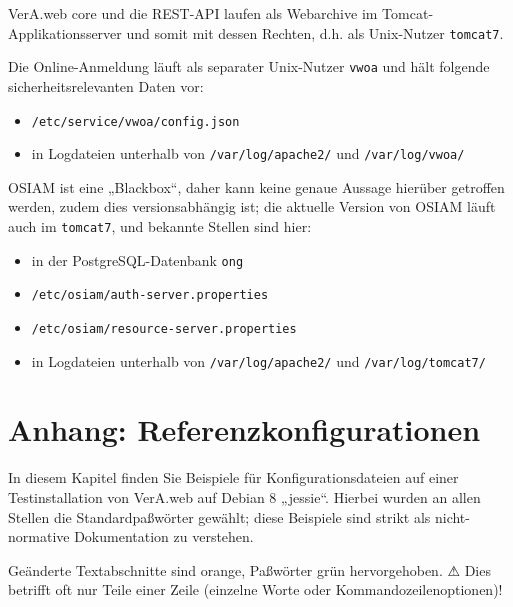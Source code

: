VerA.web core und die REST-API laufen als Webarchive im
Tomcat-Applikationsserver und somit mit dessen Rechten,
d.h. als Unix-Nutzer \texttt{tomcat7}.

\ifoa

Die Online-Anmeldung läuft als separater Unix-Nutzer \texttt{vwoa}
und hält folgende sicherheitsrelevanten Daten vor:\keinumbruch

\begin{itemize}
 \item{\texttt{/etc/service/vwoa/config.json}}
 \item{in Logdateien unterhalb von \texttt{/var/log/apache2/}
  und \texttt{/var/log/vwoa/}}
\end{itemize}

OSIAM ist eine „Blackbox“, daher kann keine genaue Aussage hierüber getroffen
werden, zudem dies versionsabhängig ist; die aktuelle Version von OSIAM läuft
auch im \texttt{tomcat7}, und bekannte Stellen sind hier:\keinumbruch

\begin{itemize}
 \item{in der PostgreSQL-Datenbank \texttt{ong}}
 \item{\texttt{/etc/osiam/auth-server.properties}}
 \item{\texttt{/etc/osiam/resource-server.properties}}
 \item{in Logdateien unterhalb von \texttt{/var/log/apache2/}
  und \texttt{/var/log/tomcat7/}}
\end{itemize}

\fi%

\ifupgradeanleitung\else%

\section{Anhang: Referenzkonfigurationen}\label{sec:refcfg}

In diesem Kapitel finden Sie Beispiele für Konfigurationsdateien
auf einer Testinstallation von VerA.web auf Debian 8 „jessie“.
Hierbei wurden an allen Stellen die Standardpaßwörter gewählt;
diese Beispiele sind strikt als nicht-normative Dokumentation
zu verstehen.


{\color{RedOrange} Geänderte Textabschnitte} sind orange,
{\color{ForestGreen} Paßwörter} grün hervorgehoben. ⚠ Dies
betrifft oft nur Teile einer Zeile (einzelne Worte oder
Kommandozeilenoptionen)!

